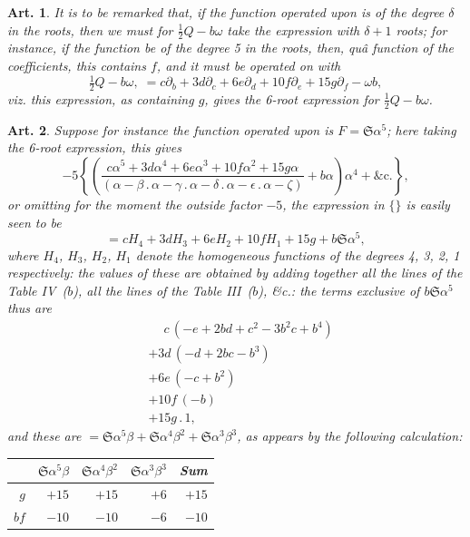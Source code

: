 \documentclass[11pt,a4paper]{article}
\theoremstyle{cayley}
\newtheorem{art}{Art.}[section]
\begin{document}
\setcounter{art}{29}
\begin{art}
It is to be remarked that, if the function operated upon is of the degree $\delta$ in the roots, then we must for $\frac{1}{2}Q - b\omega$ take the expression with $\delta + 1$ roots; for instance, if the function be of the degree 5 in the roots, then, \textit{qu\^{a}} function of the coefficients, this contains $f$, and it must be operated on with
\[
\tfrac{1}{2}Q - b\omega,\; = c\partial_{b} + 3d\partial_{c} + 6e\partial_{d} + 10f\partial_{e} + 15g\partial_{f} - \omega b,
\]
viz. this expression, as containing $g$, gives the 6-root expression for $\frac{1}{2}Q - b\omega$.
\end{art}

\setcounter{art}{30}
\begin{art}
Suppose for instance the function operated upon is $F = \mathfrak{S}\alpha^{5}$; here taking the 6-root expression, this gives
\[
-5\left\{\left(\frac{c\alpha^{5} + 3d\alpha^{4} + 6e\alpha^{3} + 10f\alpha^{2} + 15g\alpha}{(\alpha - \beta\,.\,\alpha - \gamma\,.\,\alpha - \delta\,.\,\alpha - \epsilon\,.\,\alpha - \zeta)} + b\alpha\right)\alpha^{4} + \&\mathrm{c}.\right\},
\]
or omitting for the moment the outside factor $-5$, the expression in $\{\}$ is easily seen to be
\[
= cH_{4} + 3dH_{3} + 6eH_{2} + 10fH_{1} + 15g + b\mathfrak{S}\alpha^{5},
\]
where $H_{4}$, $H_{3}$, $H_{2}$, $H_{1}$ denote the homogeneous functions of the degrees 4, 3, 2, 1 respectively: the values of these are obtained by adding together all the lines of the Table IV~($b$), all the lines of the Table III~($b$), \&c.: the terms exclusive of $b\mathfrak{S}\alpha^{5}$ thus are
\begin{align*}
&\phantom{+}c\,(-e + 2bd + c^{2} - 3b^{2}c + b^{4})\\
&+ 3d\,(-d + 2bc - b^{3})\\
&+ 6e\,(-c + b^{2})\\
&+ 10f\,(-b)\\
&+ 15g\,.\,1,
\end{align*}
and these are $= \mathfrak{S}\alpha^{5}\beta + \mathfrak{S}\alpha^{4}\beta^{2} + \mathfrak{S}\alpha^{3}\beta^{3}$, as appears by the following calculation:
\begin{center}
\begin{tabular}{r|rrr|r}
 & $\mathfrak{S}\alpha^{5}\beta$ & $\mathfrak{S}\alpha^{4}\beta^{2}$ & $\mathfrak{S}\alpha^{3}\beta^{3}$ & Sum \\
\hline
$g$ & $+15$ & $+15$ & $+6$ & $+15$ \\
$bf$ & $-10$ & $-10$ & $-6$ & $-10$ \\

\end{tabular}
\end{center}
\end{art}
\end{document}
